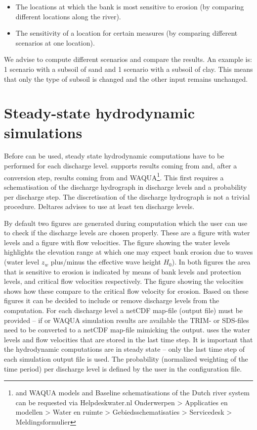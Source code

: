 \begin{itemize}
\item The locations at which the bank is most sensitive to erosion (by comparing different locations along the river).
\item The sensitivity of a location for certain measures (by comparing different scenarios at one location).
\end{itemize}

We advise to compute different scenarios and compare the results.
An example is: 1 scenario with a subsoil of sand and 1 scenario with a subsoil of clay.
This means that only the type of subsoil is changed and the other input remains unchanged.

\section{Steady-state hydrodynamic simulations}

Before \dfastbe can be used, steady state hydrodynamic computations have to be performed for each discharge level.
\dfastbe supports results coming from \dflowfm and, after a conversion step, results coming from \dflow and WAQUA\footnote{\dflowfm and WAQUA models and Baseline schematisations of the Dutch river system can be requested via Helpdeskwater.nl Onderwerpen > Applicaties en modellen > Water en ruimte > Gebiedsschematisaties > Servicedesk > Meldingsformulier}.
This first requires a schematisation of the discharge hydrograph in discharge levels and a probability per discharge step.
The discretisation of the discharge hydrograph is not a trivial procedure.
Deltares advises to use at least ten discharge levels.

By default two figures are generated during \dfastbe computation which the user can use to check if the discharge levels are chosen properly.
These are a figure with water levels and a figure with flow velocities.
The figure showing the water levels highlights the elevation range at which one may expect bank erosion due to waves (water level $z_w$ plus/minus the effective wave height $H_0$).
In both figures the area that is sensitive to erosion is indicated by means of bank levels and protection levels, and critical flow velocities respectively.
The figure showing the velocities shows how these compare to the critical flow velocity for erosion.
Based on these figures it can be decided to include or remove discharge levels from the computation.
For each discharge level a netCDF map-file (\dflowfm output file) must be provided -- if \dflow or WAQUA simulation results are available the TRIM- or SDS-files need to be converted to a netCDF map-file mimicking the \dflowfm output.
\dfastbe uses the water levels and flow velocities that are stored in the last time step.
It is important that the hydrodynamic computations are in steady state -- only the last time step of each simulation output file is used.
The probability (normalized weighting of the time period) per discharge level is defined by the user in the configuration file.

